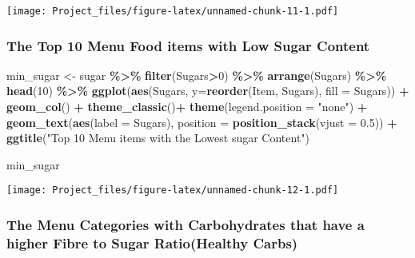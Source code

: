 \documentclass[
]{article}
\newenvironment{Shaded}{\begin{snugshade}}{\end{snugshade}}
\newcommand{\AttributeTok}[1]{\textcolor[rgb]{0.13,0.29,0.53}{#1}}
\newcommand{\DecValTok}[1]{\textcolor[rgb]{0.00,0.00,0.81}{#1}}
\newcommand{\FloatTok}[1]{\textcolor[rgb]{0.00,0.00,0.81}{#1}}
\newcommand{\FunctionTok}[1]{\textcolor[rgb]{0.13,0.29,0.53}{\textbf{#1}}}
\newcommand{\NormalTok}[1]{#1}
\newcommand{\OtherTok}[1]{\textcolor[rgb]{0.56,0.35,0.01}{#1}}
\newcommand{\SpecialCharTok}[1]{\textcolor[rgb]{0.81,0.36,0.00}{\textbf{#1}}}
\newcommand{\StringTok}[1]{\textcolor[rgb]{0.31,0.60,0.02}{#1}}
\begin{document}
\texttt{[image: Project\_files/figure-latex/unnamed-chunk-11-1.pdf]}

\hypertarget{the-top-10-menu-food-items-with-low-sugar-content}{%
\subsubsection{The Top 10 Menu Food items with Low Sugar
Content}\label{the-top-10-menu-food-items-with-low-sugar-content}}

\begin{Shaded}
\begin{Highlighting}[]
\NormalTok{min\_sugar }\OtherTok{\textless{}{-}}\NormalTok{ sugar }\SpecialCharTok{\%\textgreater{}\%} 
  \FunctionTok{filter}\NormalTok{(Sugars}\SpecialCharTok{\textgreater{}}\DecValTok{0}\NormalTok{) }\SpecialCharTok{\%\textgreater{}\%} 
  \FunctionTok{arrange}\NormalTok{(Sugars) }\SpecialCharTok{\%\textgreater{}\%} 
  \FunctionTok{head}\NormalTok{(}\DecValTok{10}\NormalTok{) }\SpecialCharTok{\%\textgreater{}\%} 
  \FunctionTok{ggplot}\NormalTok{(}\FunctionTok{aes}\NormalTok{(Sugars, }
             \AttributeTok{y=}\FunctionTok{reorder}\NormalTok{(Item,}
\NormalTok{                       Sugars),}
             \AttributeTok{fill =}\NormalTok{ Sugars)) }\SpecialCharTok{+}
  \FunctionTok{geom\_col}\NormalTok{() }\SpecialCharTok{+} 
  \FunctionTok{theme\_classic}\NormalTok{()}\SpecialCharTok{+}
  \FunctionTok{theme}\NormalTok{(}\AttributeTok{legend.position =} \StringTok{"none"}\NormalTok{) }\SpecialCharTok{+} 
  \FunctionTok{geom\_text}\NormalTok{(}\FunctionTok{aes}\NormalTok{(}\AttributeTok{label =}\NormalTok{ Sugars),}
            \AttributeTok{position =} \FunctionTok{position\_stack}\NormalTok{(}\AttributeTok{vjust =} \FloatTok{0.5}\NormalTok{)) }\SpecialCharTok{+} \FunctionTok{ggtitle}\NormalTok{(}\StringTok{"Top 10 Menu items with the Lowest sugar Content"}\NormalTok{)}


\NormalTok{min\_sugar}
\end{Highlighting}
\end{Shaded}

\texttt{[image: Project\_files/figure-latex/unnamed-chunk-12-1.pdf]}

\hypertarget{the-menu-categories-with-carbohydrates-that-have-a-higher-fibre-to-sugar-ratiohealthy-carbs}{%
\subsubsection{The Menu Categories with Carbohydrates that have a higher
Fibre to Sugar Ratio(Healthy
Carbs)}\label{the-menu-categories-with-carbohydrates-that-have-a-higher-fibre-to-sugar-ratiohealthy-carbs}}
\end{document}
